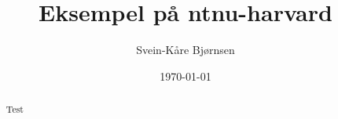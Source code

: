\documentclass[norsk, a4paper, 11pt]{article}
\title{Eksempel på ntnu-harvard}
\author{Svein-Kåre Bjørnsen}
\date{\today}
\begin{document}
\maketitle

\begin{abstract}
Test
\end{abstract}




\end{document}
